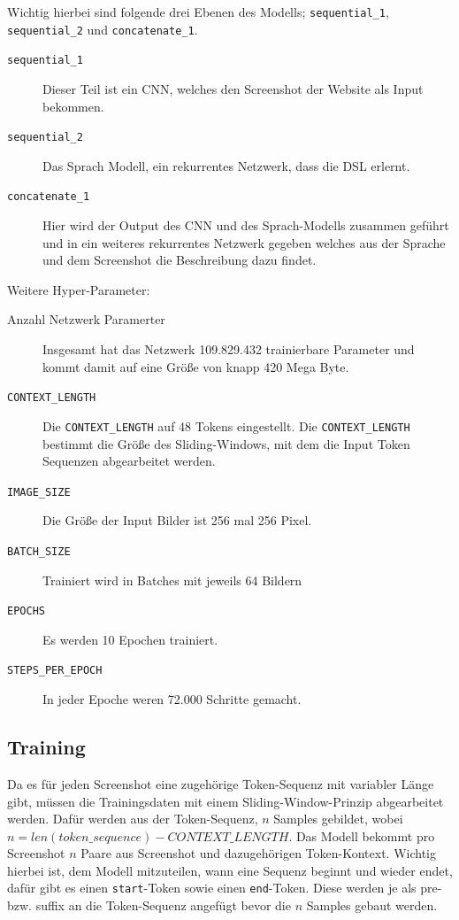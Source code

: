 \documentclass[pdftex,a4paper,halfparskip, article]{scrartcl}
\begin{document}
Wichtig hierbei sind folgende drei Ebenen des Modells; \texttt{sequential\_1}, \texttt{sequential\_2} und \texttt{concatenate\_1}. 

\begin{description}
	\item[\texttt{sequential\_1}] Dieser Teil ist ein CNN, welches den Screenshot der Website als Input bekommen.
	\item[\texttt{sequential\_2}] Das Sprach Modell, ein rekurrentes Netzwerk, dass die DSL erlernt.
	\item[\texttt{concatenate\_1}] Hier wird der Output des CNN und des Sprach-Modells zusammen geführt und in ein weiteres rekurrentes Netzwerk gegeben welches aus der Sprache und dem Screenshot die Beschreibung dazu findet.
\end{description}

Weitere Hyper-Parameter:
\begin{description}
	\item[Anzahl Netzwerk Paramerter] Insgesamt hat das Netzwerk 109.829.432 trainierbare Parameter und kommt damit auf eine Größe von knapp 420 Mega Byte.
	\item[\texttt{CONTEXT\_LENGTH}] Die \texttt{CONTEXT\_LENGTH} auf 48 Tokens eingestellt. Die \texttt{CONTEXT\_LENGTH} bestimmt die Größe des Sliding-Windows, mit dem die Input Token Sequenzen abgearbeitet werden. 
	\item[\texttt{IMAGE\_SIZE}] Die Größe der Input Bilder ist 256 mal 256 Pixel.
	\item[\texttt{BATCH\_SIZE}] Trainiert wird in Batches mit jeweils 64 Bildern
	\item[\texttt{EPOCHS}] Es werden 10 Epochen trainiert.
	\item[\texttt{STEPS\_PER\_EPOCH}] In jeder Epoche weren 72.000 Schritte gemacht.
	
\end{description}

\subsection{Training}\label{sub:training}

Da es für jeden Screenshot eine zugehörige Token-Sequenz mit variabler Länge gibt, müssen die Trainingsdaten mit einem Sliding-Window-Prinzip abgearbeitet werden. Dafür werden aus der Token-Sequenz, $n$ Samples gebildet, wobei $n = len(token\_sequence) - CONTEXT\_LENGTH$. Das Modell bekommt pro Screenshot $n$ Paare aus Screenshot und dazugehörigen Token-Kontext. Wichtig hierbei ist, dem Modell mitzuteilen, wann eine Sequenz beginnt und wieder endet, dafür gibt es einen \texttt{start}-Token sowie einen \texttt{end}-Token. Diese werden je als pre- bzw. suffix an die Token-Sequenz angefügt bevor die $n$ Samples gebaut werden. 
\end{document}
